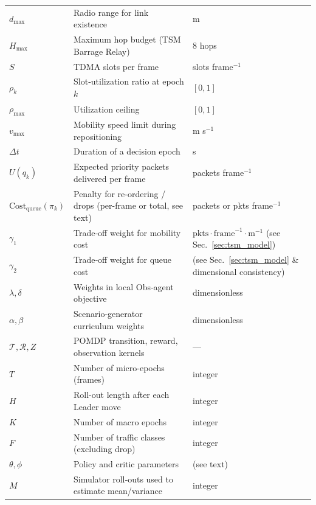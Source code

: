 \documentclass[doc.tex]{subfiles}
\begin{document}
\begin{table}[htbp]
\begin{tabularx}{\linewidth}{@{}>{\raggedright\arraybackslash}p{3.2cm}%
                                 X%
                                 >{\raggedright\arraybackslash}p{3.6cm}@{}}
$d_{\max}$              & Radio range for link existence                        & m \\
$H_{\max}$              & Maximum hop budget (TSM Barrage Relay)                & $8$ hops \\
$S$                     & TDMA slots per frame                                  & slots frame$^{-1}$ \\
$\rho_k$                & Slot‑utilization ratio at epoch $k$                   & $[0,1]$ \\
$\rho_{\max}$           & Utilization ceiling                                   & $[0,1]$ \\
$v_{\max}$              & Mobility speed limit during repositioning             & m s$^{-1}$ \\
$\Delta t$              & Duration of a decision epoch                          & s \\
$U(q_k)$                & Expected priority packets delivered per frame         & packets frame$^{-1}$ \\
$\mathrm{Cost}_{\text{queue}}(\pi_k)$ & Penalty for re‑ordering / drops (per-frame or total, see text) & packets or pkts frame$^{-1}$ \\
$\gamma_1$              & Trade‑off weight for mobility cost                    & $\text{pkts}\cdot\text{frame}^{-1}\cdot\text{m}^{-1}$ (see Sec.~\ref{sec:tsm_model}) \\
$\gamma_2$              & Trade‑off weight for queue cost                       & (see Sec.~\ref{sec:tsm_model} \& dimensional consistency) \\ %
$\lambda,\delta$        & Weights in local Obs‑agent objective                  & dimensionless \\
$\alpha,\beta$          & Scenario‑generator curriculum weights                 & dimensionless \\
$\mathcal{T},\mathcal{R},Z$ & POMDP transition, reward, observation kernels     & — \\
$T$                     & Number of micro-epochs (frames)                       & integer \\
$H$                     & Roll-out length after each Leader move                & integer \\
$K$                     & Number of macro epochs                                & integer \\
$F$                     & Number of traffic classes (excluding drop)            & integer \\
$\theta,\phi$           & Policy and critic parameters                          & (see text) \\
$M$                     & Simulator roll‑outs used to estimate mean/variance    & integer \\
\bottomrule
\end{tabularx}
\end{table}
\end{document}
